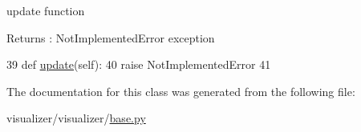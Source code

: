update function 

\begin{DoxyReturn}{Returns}
\+: Not\+Implemented\+Error exception 
\end{DoxyReturn}

\begin{DoxyCode}
39     \textcolor{keyword}{def }\hyperlink{classvisualizer_1_1base_1_1InformationWindow_af3e2a4a4d4486189380f7d1f0c6080f1}{update}(self):
40         \textcolor{keywordflow}{raise} NotImplementedError
41 
\end{DoxyCode}


The documentation for this class was generated from the following file\+:\begin{DoxyCompactItemize}
\item 
visualizer/visualizer/\hyperlink{base_8py}{base.\+py}\end{DoxyCompactItemize}
